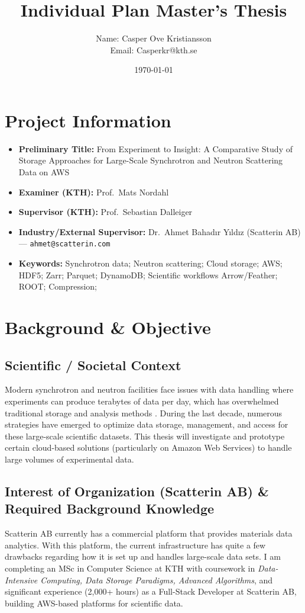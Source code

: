 \documentclass{article}
\title{Individual Plan Master's Thesis}
\author{Name: Casper Ove Kristiansson\\Email: Casperkr@kth.se}
\date{\today}
\begin{document}
\setlength\parindent{0pt}
\maketitle

\section{Project Information}
\begin{itemize}
  \item \textbf{Preliminary Title:} From Experiment to Insight: A Comparative Study of Storage Approaches for Large-Scale Synchrotron and Neutron Scattering Data on AWS
  \item \textbf{Examiner (KTH):} Prof.\ Mats Nordahl
  \item \textbf{Supervisor (KTH):} Prof.\ Sebastian Dalleiger
  \item \textbf{Industry/External Supervisor:} Dr.\ Ahmet Bahadır Yıldız (Scatterin AB) — \texttt{ahmet@scatterin.com}
  \item \textbf{Keywords:} Synchrotron data; Neutron scattering; Cloud storage; AWS; HDF5; Zarr; Parquet;  DynamoDB;  Scientific workflows Arrow/Feather; ROOT; Compression;
\end{itemize}




\section{Background \& Objective}
\subsection{Scientific / Societal Context}
Modern synchrotron and neutron facilities face issues with data handling where experiments can produce terabytes of data per day, which has overwhelmed traditional storage and analysis methods \cite{wang2018synchrotron}. During the last decade, numerous strategies have emerged to optimize data storage, management, and access for these large-scale scientific datasets. This thesis will investigate and prototype certain cloud-based solutions (particularly on Amazon Web Services) to handle large volumes of experimental data.

\subsection{Interest of Organization (Scatterin AB) \& Required Background Knowledge}
Scatterin AB currently has a commercial platform that provides materials data analytics. With this platform, the current infrastructure has quite a few drawbacks regarding how it is set up and handles large-scale data sets. I am completing an MSc in Computer Science at KTH with coursework in \emph{Data-Intensive Computing, Data Storage Paradigms, Advanced Algorithms}, and significant experience (2,000+ hours) as a Full-Stack Developer at Scatterin AB, building AWS-based platforms for scientific data.
\end{document}
